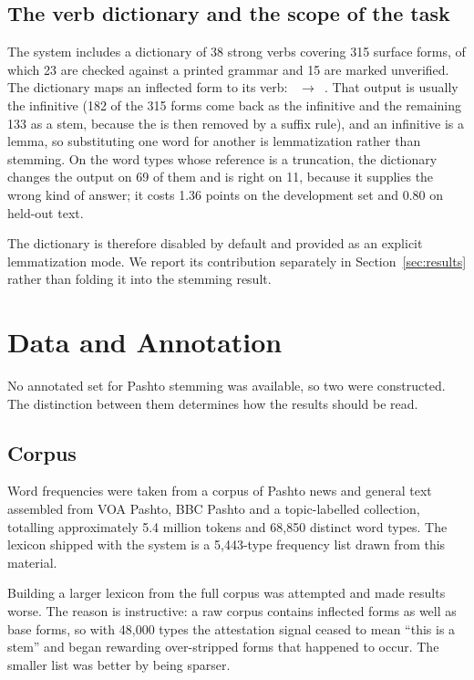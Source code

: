\documentclass[conference]{IEEEtran}
\newcommand{\ps}[1]{{\pashtofont\textpashto{#1}}}
\begin{document}
\subsection{The verb dictionary and the scope of the task}
\label{sec:scope}

The system includes a dictionary of 38 strong verbs covering 315 surface
forms, of which 23 are checked against a printed grammar and 15 are marked
unverified. The dictionary maps an inflected form to its verb:
\ps{شو}~$\rightarrow$~\ps{کېدل}. That output is usually the infinitive (182 of the 315 forms come back as the infinitive and the remaining 133 as a stem,
because the \ps{ل} is then removed by a suffix rule), and an infinitive is a
lemma, so substituting
one word for another is lemmatization rather than stemming. On the word types whose reference is a truncation, the dictionary
changes the output on 69 of them and is right on 11, because it supplies the
wrong kind of answer; it costs 1.36 points on the development set and 0.80 on
held-out text.

The dictionary is therefore disabled by default and provided as an explicit
lemmatization mode. We report its contribution separately in
Section~\ref{sec:results} rather than folding it into the stemming result.

\section{Data and Annotation}

No annotated set for Pashto stemming was available, so two were constructed.
The distinction between them determines how the results should be read.

\subsection{Corpus}

Word frequencies were taken from a corpus of Pashto news and general text
assembled from VOA Pashto, BBC Pashto and a topic-labelled collection,
totalling approximately 5.4 million tokens and 68{,}850 distinct word types.
The lexicon shipped with the system is a 5{,}443-type frequency list drawn from
this material.

Building a larger lexicon from the full corpus was attempted and made results
worse. The reason is instructive: a raw corpus contains inflected forms as
well as base forms, so with 48{,}000 types the attestation signal ceased to
mean ``this is a stem'' and began rewarding over-stripped forms that happened
to occur. The smaller list was better by being sparser.
\end{document}
